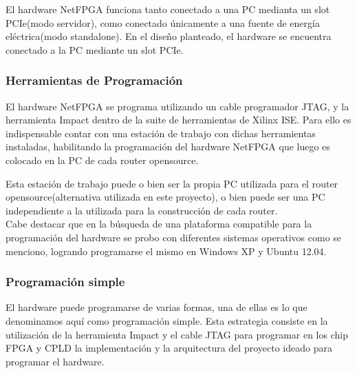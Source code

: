 El hardware NetFPGA funciona tanto conectado a una PC medianta un slot PCIe(modo servidor), como conectado \'unicamente a una fuente de energ\'ia el\'ectrica(modo standalone). En el dise\~no planteado, el hardware se encuentra conectado a la PC mediante un slot PCIe.


\subsubsection{Herramientas de Programaci\'on}

El hardware NetFPGA se programa utilizando un cable programador JTAG, y la herramienta Impact dentro de la suite de herramientas de Xilinx ISE. Para ello es indispensable contar con una estaci\'on de trabajo con dichas herramientas instaladas, habilitando la programaci\'on  del hardware NetFPGA que luego es colocado en la PC de cada router opensource.

Esta estaci\'on de trabajo puede o bien ser la propia PC utilizada para el router opensource(alternativa utilizada en este proyecto), o bien puede ser una PC independiente a la utilizada para la construcci\'on de cada router.\\

Cabe destacar que en la b\'usqueda de una plataforma compatible para la programaci\'on del hardware se probo con diferentes sistemas operativos como se menciono, logrando programarse el mismo en Windows XP y Ubuntu 12.04.

\subsubsection{Programaci\'on simple}
El hardware puede programarse de varias formas, una de ellas es lo que denominamos aqu\'i como programaci\'on simple. Esta estrategia consiste en la utilizaci\'on de la herramienta Impact y el cable JTAG para programar en los chip FPGA y CPLD la implementaci\'on y la arquitectura del proyecto ideado para programar el hardware.

